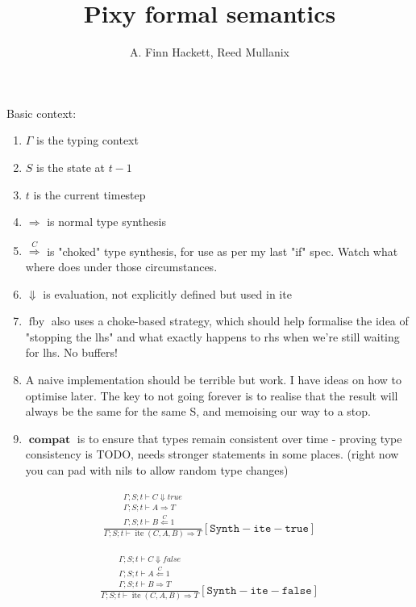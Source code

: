 \documentclass{scrartcl}
\DeclareMathOperator{\fby}{fby}
\DeclareMathOperator{\ite}{ite}
\DeclareMathOperator{\compat}{\mathbf{compat}}
\begin{document}
    \title{Pixy formal semantics}
    \author{A. Finn Hackett, Reed Mullanix}
    \maketitle
    
    Basic context:
    \begin{enumerate}
        \item $\Gamma$ is the typing context
        \item $S$ is the state at $t-1$
        \item $t$ is the current timestep
        \item $\Rightarrow$ is normal type synthesis
        \item $\overset{C}{\Rightarrow}$ is "choked" type synthesis, for use as per my last "if" spec. Watch what where does under those circumstances.
        \item $\Downarrow$ is evaluation, not explicitly defined but used in ite
        \item $\fby$ also uses a choke-based strategy, which should help formalise the idea of "stopping the lhs" and what exactly happens to rhs when we're still
        waiting for lhs. No buffers!
        \item A naive implementation should be terrible but work. I have ideas on how to optimise later. The key to not going forever is to realise that the result will always be the same for the same S, and memoising our way to a stop.
        \item $\compat$ is to ensure that types remain consistent over time - proving type consistency is TODO, needs stronger statements in some places. (right now you can pad with nils to allow random type changes)
    \end{enumerate}
    
    \begin{align*}
    \frac{
        \begin{matrix}
        \Gamma; S; t \vdash C \Downarrow true \\
        \Gamma; S; t \vdash A \Rightarrow T \\
        \Gamma; S; t \vdash B \overset{C}{\Leftarrow} 1
        \end{matrix}
    }{
        \Gamma; S; t \vdash \ite(C,A,B) \Rightarrow T
    }[\mathtt{Synth-ite-true}]
    \end{align*}
    
    \begin{align*}
    \frac{
        \begin{matrix}
        \Gamma; S; t \vdash C \Downarrow false \\
        \Gamma; S; t \vdash A \overset{C}{\Leftarrow} 1 \\
        \Gamma; S; t \vdash B \Rightarrow T
        \end{matrix}
    }{
        \Gamma; S; t \vdash \ite(C,A,B) \Rightarrow T
    }[\mathtt{Synth-ite-false}]
    \end{align*}
    
\end{document}
